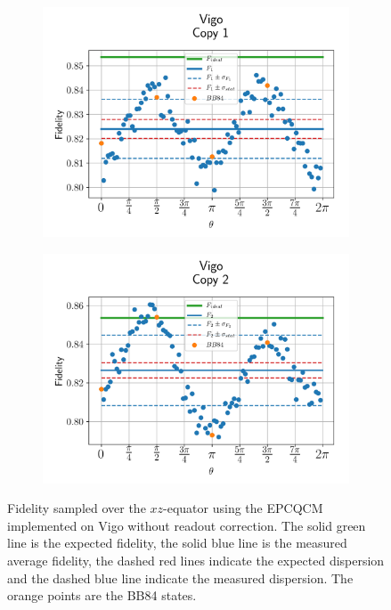 \begin{figure}[H]
  \centering
  \begin{subfigure}{.5\textwidth}
    \centering
    \includegraphics[width=\textwidth]{Figures/Economical/IBM/OnlyEquator/results_vigo_copy1.png}
    \label{fig:epc_uncorrected_vigo_equator_1}
  \end{subfigure}%
  \begin{subfigure}{.5\textwidth}
    \centering
    \includegraphics[width=\textwidth]{Figures/Economical/IBM/OnlyEquator/results_vigo_copy2.png}
    \label{fig:epc_uncorrected_vigo_equator_2}
  \end{subfigure}
  \vspace{-0.5cm}
  \caption{Fidelity sampled over the $xz$-equator using the EPCQCM implemented on Vigo without readout correction. The solid green line is the expected fidelity, the solid blue line is the measured average fidelity, the dashed red lines indicate the expected dispersion and the dashed blue line indicate the measured dispersion. The orange points are the BB84 states.}
  \label{fig:epc_uncorrected_vigo_equator}
\end{figure}


